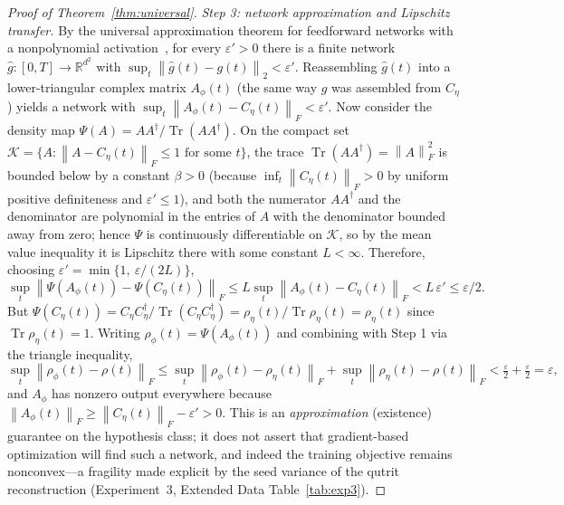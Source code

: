 \documentclass[11pt]{article}
\DeclareMathOperator{\Tr}{Tr}
\newcommand{\R}{\mathbb{R}}
\newcommand{\eps}{\varepsilon}
\newcommand{\norm}[1]{\left\lVert #1 \right\rVert}
\begin{document}
\begin{proof}[Proof of Theorem~\ref{thm:universal}]
\emph{Step 3: network approximation and Lipschitz transfer.} By the universal approximation theorem for feedforward networks with a nonpolynomial activation~\cite{cybenko1989approximation,hornik1991approximation}, for every $\eps'>0$ there is a finite network $\widehat g:[0,T]\to\R^{d^2}$ with $\sup_t\norm{\widehat g(t)-g(t)}_2<\eps'$. Reassembling $\widehat g(t)$ into a lower-triangular complex matrix $A_\phi(t)$ (the same way $g$ was assembled from $C_\eta$) yields a network with $\sup_t\norm{A_\phi(t)-C_\eta(t)}_F<\eps'$. Now consider the density map $\Psi(A)=AA^\dagger/\Tr(AA^\dagger)$. On the compact set $\mathcal{K}=\{A:\norm{A-C_\eta(t)}_F\le1\text{ for some }t\}$, the trace $\Tr(AA^\dagger)=\norm{A}_F^2$ is bounded below by a constant $\beta>0$ (because $\inf_t\norm{C_\eta(t)}_F>0$ by uniform positive definiteness and $\eps'\le1$), and both the numerator $AA^\dagger$ and the denominator are polynomial in the entries of $A$ with the denominator bounded away from zero; hence $\Psi$ is continuously differentiable on $\mathcal{K}$, so by the mean value inequality it is Lipschitz there with some constant $L<\infty$. Therefore, choosing $\eps'=\min\{1,\ \eps/(2L)\}$,
\[
\sup_t\norm{\Psi(A_\phi(t))-\Psi(C_\eta(t))}_F\le L\sup_t\norm{A_\phi(t)-C_\eta(t)}_F< L\,\eps'\le\eps/2.
\]
But $\Psi(C_\eta(t))=C_\eta C_\eta^\dagger/\Tr(C_\eta C_\eta^\dagger)=\rho_\eta(t)/\Tr\rho_\eta(t)=\rho_\eta(t)$ since $\Tr\rho_\eta(t)=1$. Writing $\rho_\phi(t)=\Psi(A_\phi(t))$ and combining with Step 1 via the triangle inequality,
\[
\sup_t\norm{\rho_\phi(t)-\rho(t)}_F\le\sup_t\norm{\rho_\phi(t)-\rho_\eta(t)}_F+\sup_t\norm{\rho_\eta(t)-\rho(t)}_F<\tfrac{\eps}{2}+\tfrac{\eps}{2}=\eps,
\]
and $A_\phi$ has nonzero output everywhere because $\norm{A_\phi(t)}_F\ge\norm{C_\eta(t)}_F-\eps'>0$. This is an \emph{approximation} (existence) guarantee on the hypothesis class; it does not assert that gradient-based optimization will find such a network, and indeed the training objective remains nonconvex---a fragility made explicit by the seed variance of the qutrit reconstruction (Experiment~3, Extended Data Table~\ref{tab:exp3}).
\end{proof}
\end{document}
